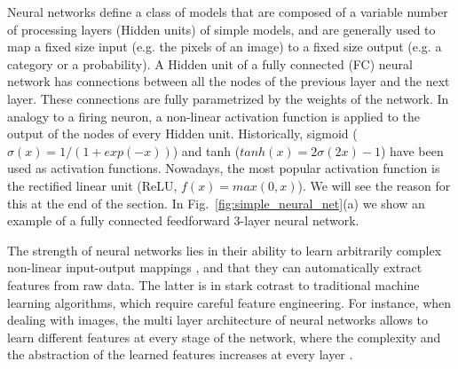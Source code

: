 Neural networks define a class of models that are composed of a variable number of processing layers (Hidden units) of simple models, and are generally used to map a fixed size input (e.g. the pixels of an image) to a fixed size output (e.g. a category or a probability). A Hidden unit of a fully connected (FC) neural network has connections between all the nodes of the previous layer and the next layer. These connections are fully parametrized by the weights of the network. In analogy to a firing neuron, a non-linear activation function is applied to the output of the nodes of every Hidden unit. Historically, sigmoid ($\sigma(x) = 1/(1 + exp(-x))$) and tanh ($tanh(x) = 2\sigma(2x) - 1$) have been used as activation functions. Nowadays, the most popular activation function is the rectified linear unit (ReLU, $f(x) = max(0,x)$). We will see the reason for this at the end of the section. 
In Fig.~\ref{fig:simple_neural_net}(a) we show an example of a fully connected feedforward 3-layer neural network. 

The strength of neural networks lies in their ability to learn arbitrarily complex non-linear input-output mappings \parencite{cybenko1989}, and that they can automatically extract features from raw data. The latter is in stark cotrast to traditional machine learning algorithms, which require careful feature engineering. For instance, when dealing with images, the multi layer architecture of neural networks allows to learn different features at every stage of the network, where the complexity and the abstraction of the learned features increases at every layer \parencite{farabet2013}.

